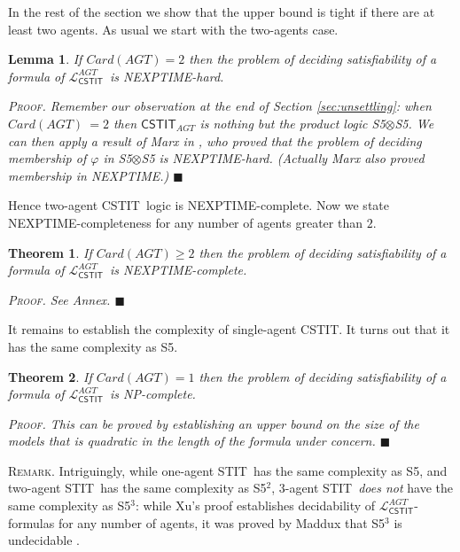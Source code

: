 \documentclass{article}
\newtheorem{theorem}{Theorem}
\newtheorem{lemma}{Lemma}
\newenvironment{remark}{\medskip\noindent \textsc{Remark.}} {\medskip}
\newenvironment{pf}{\em \medskip\noindent \textsc{Proof.}}
{\hspace*{\fill}\nolinebreak[2]\hspace*{\fill}$\blacksquare$\medskip}
\renewcommand{\phi}{\varphi}
\newcommand{\card}[1]{\mathit{Card}(#1)}           \newcommand{\ext}[1]{|#1|}
\newcommand{\agtset}{\ensuremath{\mathit{AGT}}}
\newcommand{\STIT} {{\textsf{STIT}}}              \newcommand{\CSTIT}{{\textsf{CSTIT}}}            \newcommand{\DSTIT}{{\textsf{DSTIT}}}
\newcommand{\LCSTIT}{$\mathcal{L}_{\mathsf{CSTIT}}^\agtset$}
\begin{document}
In the rest of the section we show that the upper bound is tight
if there are at least two agents. As usual we start with the two-agents case.

\begin{lemma}\label{lem:ComplexCstitLowerTwoAgents}
If $\card{\agtset} = 2$ then the problem of deciding satisfiability of
a formula of \LCSTIT\ is NEXPTIME-hard.

\begin{pf}
Remember our observation at the end of Section \ref{sec:unsettling}:
when $\card{\agtset} \ = 2$ then $\CSTIT_{\agtset} $
is nothing but the product logic S5$\otimes$S5.
We can then apply a result of Marx in \cite{Marx99}, who proved that the problem of
deciding membership of $\phi$ in S5$\otimes$S5 is NEXPTIME-hard.
(Actually Marx also proved membership in NEXPTIME.)
\end{pf}
\end{lemma}

Hence two-agent \CSTIT\ logic is NEXPTIME-complete.
Now we state NEXPTIME-completeness for any number of agents greater than $2$.



\begin{theorem}\label{theo:cstitNexptComplete}
If $\card{\agtset} \geq 2$ then the problem of deciding satisfiability
of a formula of \LCSTIT\ is NEXPTIME-complete.

\begin{pf}
See Annex.
\end{pf}

\end{theorem}

It remains to establish the complexity of single-agent \CSTIT.
It turns out that it has the same complexity as S5.

\begin{theorem}\label{theo:cstitSingleagentNpComplete}
If $\card{\agtset} = 1$ then the problem of deciding satisfiability
of a formula of \LCSTIT\ is NP-complete.

\begin{pf}
This can be proved by establishing an upper bound on the size of the models that is
quadratic in the length of the formula under concern.
\end{pf}

\end{theorem}

\begin{remark}
Intriguingly, while one-agent \STIT\ has the same complexity as S5, and
two-agent \STIT\ has the same complexity as S5$^2$,
$3$-agent \STIT\ \emph{does not} have the same complexity as S5$^3$:
while Xu's proof establishes decidability of \LCSTIT-formulas for any number of agents,
it was proved by Maddux that S5$^3$ is undecidable \cite{MarxMikulas00}.
\end{remark}
\end{document}
